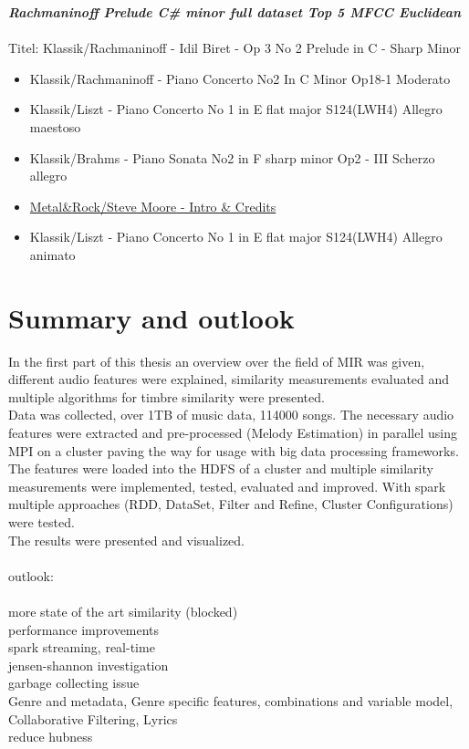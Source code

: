 \textit{\textbf{Rachmaninoff Prelude C\# minor full dataset Top 5 MFCC Euclidean\\}}
\\
Titel: Klassik/Rachmaninoff - Idil Biret - Op 3 No 2 Prelude in C - Sharp Minor
\begin{itemize}
	\setlength\itemsep{-0.5em}
	\item Klassik/Rachmaninoff - Piano Concerto No2 In C Minor Op18-1 Moderato
	\item Klassik/Liszt - Piano Concerto No 1 in E flat major S124(LWH4) Allegro maestoso
	\item Klassik/Brahms - Piano Sonata No2 in F sharp minor Op2 - III Scherzo allegro
	\item \underline{Metal\&Rock/Steve Moore - Intro \& Credits}
	\item Klassik/Liszt - Piano Concerto No 1 in E flat major S124(LWH4) Allegro animato
\end{itemize}

\section{Summary and outlook}

In the first part of this thesis an overview over the field of MIR was given, different audio features were explained, similarity measurements evaluated and multiple algorithms for timbre similarity were presented.\\
Data was collected, over 1TB of music data, 114000 songs. The necessary audio features were extracted and pre-processed (Melody Estimation) in parallel using MPI on a cluster paving the way for usage with big data processing frameworks.\\
The features were loaded into the HDFS of a cluster and multiple similarity measurements were implemented, tested, evaluated and improved. With spark multiple approaches (RDD, DataSet, Filter and Refine, Cluster Configurations) were tested.\\
The results were presented and visualized.\\
\ \\
outlook:\\
\ \\
more state of the art similarity (blocked)\\
performance improvements\\
spark streaming, real-time\\
jensen-shannon investigation\\
garbage collecting issue\\
Genre and metadata, Genre specific features, combinations and variable model, Collaborative Filtering, Lyrics\\
reduce hubness\\

